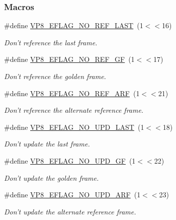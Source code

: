 \subsubsection*{Macros}
\begin{DoxyCompactItemize}
\item 
\#define \hyperlink{group__vp8__encoder_gafb51c67e5743275146bc1fc425727da3}{V\+P8\+\_\+\+E\+F\+L\+A\+G\+\_\+\+N\+O\+\_\+\+R\+E\+F\+\_\+\+L\+A\+S\+T}~(1$<$$<$16)
\begin{DoxyCompactList}\small\item\em Don't reference the last frame. \end{DoxyCompactList}\item 
\#define \hyperlink{group__vp8__encoder_gabb5e95343a2738abef44eca13059da33}{V\+P8\+\_\+\+E\+F\+L\+A\+G\+\_\+\+N\+O\+\_\+\+R\+E\+F\+\_\+\+G\+F}~(1$<$$<$17)
\begin{DoxyCompactList}\small\item\em Don't reference the golden frame. \end{DoxyCompactList}\item 
\#define \hyperlink{group__vp8__encoder_ga650ab0baea12be91082226a5cc18776a}{V\+P8\+\_\+\+E\+F\+L\+A\+G\+\_\+\+N\+O\+\_\+\+R\+E\+F\+\_\+\+A\+R\+F}~(1$<$$<$21)
\begin{DoxyCompactList}\small\item\em Don't reference the alternate reference frame. \end{DoxyCompactList}\item 
\#define \hyperlink{group__vp8__encoder_ga602edb6b02a89cb2db7a16d6dffba583}{V\+P8\+\_\+\+E\+F\+L\+A\+G\+\_\+\+N\+O\+\_\+\+U\+P\+D\+\_\+\+L\+A\+S\+T}~(1$<$$<$18)
\begin{DoxyCompactList}\small\item\em Don't update the last frame. \end{DoxyCompactList}\item 
\#define \hyperlink{group__vp8__encoder_gab01d066c5236457d345ce1cab4c41d6b}{V\+P8\+\_\+\+E\+F\+L\+A\+G\+\_\+\+N\+O\+\_\+\+U\+P\+D\+\_\+\+G\+F}~(1$<$$<$22)
\begin{DoxyCompactList}\small\item\em Don't update the golden frame. \end{DoxyCompactList}\item 
\#define \hyperlink{group__vp8__encoder_ga1cff46a5287e73a620660030d40b9e6c}{V\+P8\+\_\+\+E\+F\+L\+A\+G\+\_\+\+N\+O\+\_\+\+U\+P\+D\+\_\+\+A\+R\+F}~(1$<$$<$23)
\begin{DoxyCompactList}\small\item\em Don't update the alternate reference frame. \end{DoxyCompactList}\item 

\end{DoxyCompactItemize}
